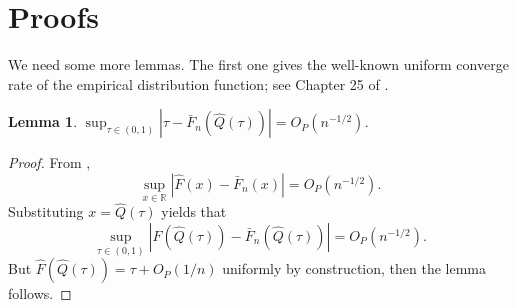 \documentclass[12pt]{article}
\newtheorem{lemma}{Lemma}
\theoremstyle{remark}
\newcommand{\p}{P}
\begin{document}
\section{%
Proofs} \label{pro}
We need some more lemmas. The first one gives the well-known uniform converge rate of the empirical distribution function; see Chapter 25 of \cite{SW1986}.
\begin{lemma}\label{lem:rate}
	$\sup_{\tau\in (0,1)}|\tau-\bar{F}_n(\widehat{Q}(\tau))|=O_{\p}(n^{-1/2})$.
\end{lemma}
\begin{proof}
	From \cite{B1981},
	\begin{equation*}
		\sup_{x\in \mathbb{R}}|\widehat{F}(x)-\bar{F}_n(x)|=O_{\p}(n^{-1/2}).
	\end{equation*}
	Substituting $x=\widehat{Q}(\tau)$ yields that
	\begin{equation*}
		\sup_{\tau\in (0,1)}|\widehat{F}(\widehat{Q}(\tau))-\bar{F}_n(\widehat{Q}(\tau))|=O_{\p}(n^{-1/2}).
	\end{equation*}
	But $\widehat{F}(\widehat{Q}(\tau))=\tau+O_{\p}(1/n)$ uniformly by construction, then the lemma follows.
\end{proof}
\end{document}
